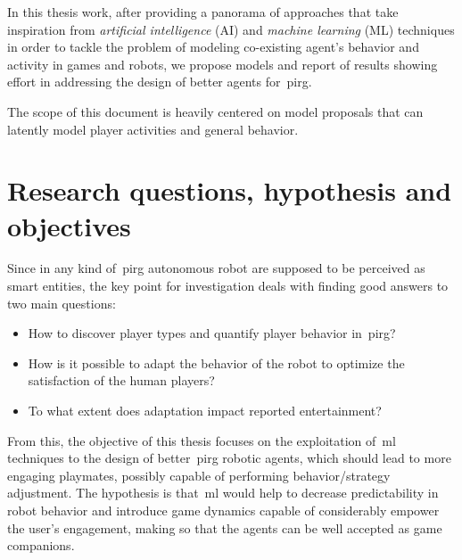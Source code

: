 In this thesis work, after providing a panorama of approaches that take inspiration from \textit{artificial intelligence} (AI) and \textit{machine learning} (ML) techniques in order to tackle the problem of modeling co-existing agent's behavior and activity in games and robots, we propose models and report of results showing effort in addressing the design of better agents for~\gls{pirg}.

The scope of this document is heavily centered on model proposals that can latently model player activities and general behavior. 

\section{Research questions, hypothesis and objectives}\label{sec:research_question}
Since in any kind of~\gls{pirg} autonomous robot are supposed to be perceived as smart entities, the key point for investigation deals with finding good answers to two main questions:

\begin{itemize}
\item How to discover player types and quantify player behavior in~\gls{pirg}?
\item How is it possible to adapt the behavior of the robot to optimize the satisfaction of the human players?
\item To what extent does adaptation impact reported entertainment?
\end{itemize}

From this, the objective of this thesis focuses on the exploitation of~\gls{ml} techniques to the design of better~\gls{pirg} robotic agents, which should lead to more engaging playmates, possibly capable of performing behavior/strategy adjustment. The hypothesis is that~\gls{ml} would help to decrease predictability in robot behavior and introduce game dynamics capable of considerably empower the user’s engagement, making so that the agents can be well accepted as game companions.


